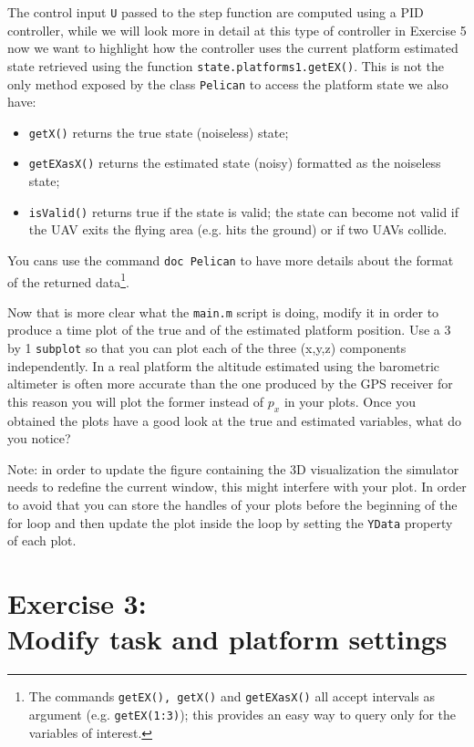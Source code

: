 \documentclass[a4paper,11pt]{article}
\begin{document}
The control input \texttt{U} passed to the step function are computed using a PID controller, while we will look more in detail at this type of controller in Exercise 5 now we want to highlight how the controller uses the current platform estimated state retrieved using the function \texttt{state.platforms{1}.getEX()}.
This is not the only method exposed by the class \texttt{Pelican} to access the platform state we also have:
\begin{itemize}
 \item \texttt{getX()} returns the true state (noiseless) state;
 \item \texttt{getEXasX()} returns the estimated state (noisy) formatted as the noiseless state;
 \item \texttt{isValid()} returns true if the state is valid; the state can become not valid if the UAV exits the flying area (e.g. hits the ground) or if two UAVs collide.
\end{itemize}
You cans use the command \texttt{doc Pelican} to have more details about the format of the returned data\footnote{The commands \texttt{getEX(), getX()} and \texttt{getEXasX()} all accept intervals as argument (e.g. \texttt{getEX(1:3)}); this provides an easy way to query only for the variables of interest.}.
 
Now that is more clear what the \texttt{main.m} script is doing, modify it in order to produce a time plot of the true and of the estimated platform position. Use a 3 by 1 \texttt{subplot} so that you can plot each of the three (x,y,z) components independently.   
In a real platform the altitude estimated using the barometric altimeter is often more accurate than the one produced by the GPS receiver for this reason you will plot the former instead of $p_x$ in your plots.
Once you obtained the plots have a good look at the true and estimated variables, what do you notice?

\textsf{Note:}
in order to update the figure containing the 3D visualization the simulator needs to redefine the current window, this might interfere with your plot.
In order to avoid that you can store the handles of your plots before the beginning of the for loop and then update the plot inside the loop by setting the \texttt{YData} property of each plot.

\section*{Exercise 3:\\Modify task and platform settings}
\end{document}
